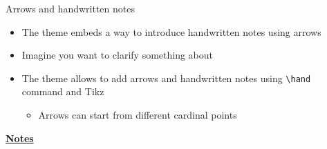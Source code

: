 \documentclass[10pt]{beamer}
\begin{document}
\begin{frame}[t]
    {Arrows and handwritten notes}\bigskip
    \begin{itemize}
        \item The theme embeds a way to introduce handwritten notes using arrows \bigskip\medskip
        \item Imagine you want to clarify something about  \bigskip\medskip
       \item The theme allows to add arrows and handwritten notes using \texttt{\textbackslash hand} command and Tikz \medskip
        \begin{itemize}
            \item Arrows can start from different cardinal points 
        \end{itemize}
    \end{itemize}
\end{frame}
\begin{flushleft}
    \underline{\textbf{Notes}}\setlength{\parskip}{.15cm}\notesize\newline\par
\end{flushleft}
\end{document}
